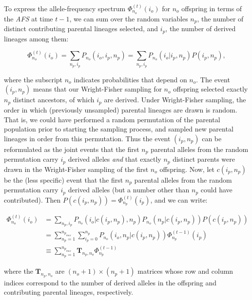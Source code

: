 \documentclass[review]{elsarticle}
\newcommand{\afs}[2]{\Phi_{#1}^{(#2)}}
\begin{document}
To express the allele-frequency spectrum $\afs{n_o}{t}(i_o)$ for $n_o$ offspring in terms of the
\textit{AFS} at time $t-1$, we can sum over the random variables $n_p$, the number of distinct
contributing parental lineages selected, and $i_p$, the number of derived lineages among them:

\begin{equation}
\afs{n_o}{t}(i_o)=\sum_{n_p,i_p} P_{n_o}(i_o,i_p,n_p) = 
                  \sum_{n_p,i_p} P_{n_o}(i_o|i_p,n_p) P(i_p,n_p),
\end{equation}

where the subscript $n_o$ indicates probabilities that depend on $n_o$. The event $(i_p,n_p)$ means
that our Wright-Fisher sampling for $n_o$ offspring selected exactly $n_p$ distinct ancestors, of
which $i_p$ are derived. Under Wright-Fisher sampling, the order in which (previously unsampled)
parental lineages are drawn is random. That is, we could have performed a random permutation of the
parental population prior to starting the sampling process, and sampled new parental lineages in
order from this permutation. Thus the event $(i_p,n_p)$ can be reformulated as the joint events that
the first $n_p$ parental alleles from the random permutation carry $i_p$ derived alleles
\textit{and} that exactly $n_p$ distinct parents were drawn in the Wright-Fisher sampling of the
first $n_o$ offspring. Now, let $c(i_p,n_p)$ be the (less specific) event that the first $n_p$
parental alleles from the random permutation carry $i_p$ derived alleles (but a number other than
$n_p$ could have contributed). Then $P(c(i_p,n_p)) =\afs{n_p}{t} (i_p)$, and we can write:

\begin{equation}
\begin{split}
  \afs{n_o}{t}(i_o)
  &=      \sum_{n_p,i_p}                        P_{n_o}(i_o|c(i_p,n_p),n_p) P_{n_o}(n_p|c(i_p,n_p)) P(c(i_p,n_p)) \\
  &=      \sum_{n_p=1}^{n_{p_{max}}} \sum_{i_p=0}^{n_p} P_{n_o}(i_o,n_p|c(i_p,n_p)) \afs{n_p}{t-1}(i_p)  \\
  &\equiv \sum_{n_p=1}^{n_{p_{max}}} \mathbf{T}_{n_p,n_o}                         \afs{n_p}{t-1}
\end{split}
\label{eq:recur}
\end{equation}

where the $\mathbf{T}_{n_p,n_o}$ are $(n_o+1) \times (n_p+1)$ matrices whose row and column indices
correspond to the number of derived alleles in the offspring and contributing parental lineages,
respectively.
\end{document}
